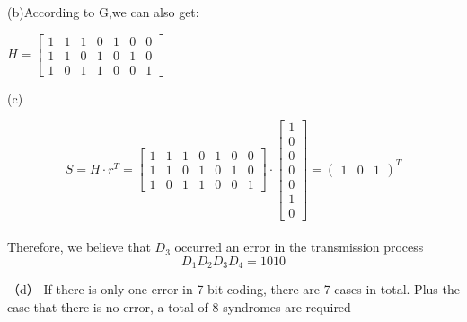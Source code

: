 \documentclass[UTF8,oneside]{article}
\begin{document}
(b)According to G,we can also get:
\begin{center}
$H=\left[\begin{array}{lllllll}
1 & 1 & 1 & 0 & 1 & 0 & 0 \\
1 & 1 & 0 & 1 & 0 & 1 & 0 \\
1 & 0 & 1 & 1 & 0 & 0 & 1
\end{array}\right]
$
\end{center}
(c)
\begin{center}
$$
S=H \cdot r^{T}=\left[\begin{array}{lllllll}
1 & 1 & 1 & 0 & 1 & 0 & 0 \\
1 & 1 & 0 & 1 & 0 & 1 & 0 \\
1 & 0 & 1 & 1 & 0 & 0 & 1
\end{array}\right] \cdot\left[\begin{array}{l}
1 \\
0 \\
0 \\
0 \\
0 \\
1 \\
0
\end{array}\right]=\left(\begin{array}{lll}
1 & 0 & 1
\end{array}\right)^{T}
$$\\
Therefore, we believe that $D_{3}$ occurred an error in the transmission process\\
$$D_1D_2D_3D_4=1010$$
\end{center}
（d）
If there is only one error in 7-bit coding, there are 7 cases in total. Plus the case that there is no error, a total of 8 syndromes are required
\end{document}
